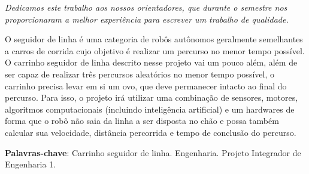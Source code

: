 \documentclass[
  12pt, %
  openright, %
  twoside, %
  a4paper, %
  english, %
  french, %
  spanish, %
  brazil %
]{abntex2}
\newcommand{\listofquadrosname}{Lista de quadros}
\begin{document}
%
%
\begin{dedicatoria}
  \vspace*{\fill}
  \centering
  \noindent
  \textit{
    Dedicamos este trabalho aos nossos orientadores, que durante o semestre nos
    proporcionaram a melhor experiência para escrever um trabalho de qualidade.
  } \vspace*{\fill}
\end{dedicatoria}

%
%

\setlength{\absparsep}{18pt}
\begin{resumo}
  O seguidor de linha é uma categoria de robôs autônomos geralmente semelhantes
  a carros de corrida cujo objetivo é realizar um percurso no menor tempo
  possível. O carrinho seguidor de linha descrito nesse projeto vai um pouco
  além, além de ser capaz de realizar três percursos aleatórios no menor tempo
  possível, o carrinho precisa levar em si um ovo, que deve permanecer intacto
  ao final do percurso. Para isso, o projeto irá utilizar uma combinação de
  sensores, motores, algoritmos computacionais (incluindo inteligência
  artificial) e um hardwares de forma que o robô não saia da linha a ser
  disposta no chão e possa também calcular sua velocidade, distância percorrida
  e tempo de conclusão do percurso.

  \textbf{Palavras-chave}: Carrinho seguidor de linha. Engenharia. Projeto
    Integrador de Engenharia 1.
\end{resumo}

%
%
\listoffigures*
\cleardoublepage

%
%
\pdfbookmark[0]{\listofquadrosname}{loq}
\listofquadros*
\cleardoublepage
\end{document}
